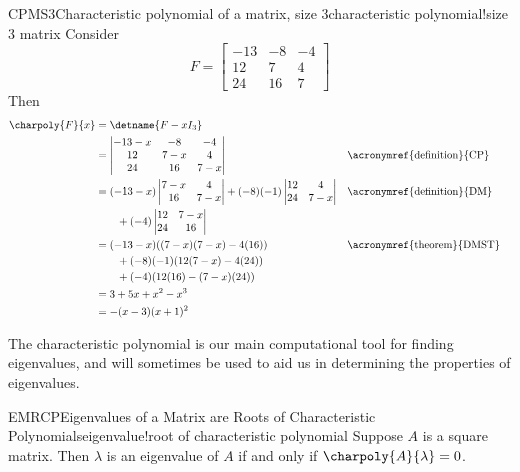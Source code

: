 %
%
\begin{example}{CPMS3}{Characteristic polynomial of a matrix, size 3}{characteristic polynomial!size 3 matrix}
Consider
%
\begin{equation*}
F=
\begin{bmatrix}
-13 & -8 & -4\\ 
12 & 7 & 4\\ 
24 & 16 & 7
\end{bmatrix}
\end{equation*}
%
Then
%
\begin{align*}
\charpoly{F}{x}&=\detname{F-xI_3}\\
&=
\begin{vmatrix}
-13-x & -8 & -4\\ 
12 & 7-x & 4\\ 
24 & 16 & 7-x
\end{vmatrix}&&\text{\acronymref{definition}{CP}}\\
%
&=
(-13-x)
\begin{vmatrix}
7-x & 4\\ 
16 & 7-x
\end{vmatrix}
+(-8)(-1)
\begin{vmatrix}
12  & 4\\ 
24  & 7-x
\end{vmatrix}&&\text{\acronymref{definition}{DM}}\\
&\quad\quad
+(-4)
\begin{vmatrix}
12 & 7-x\\ 
24 & 16
\end{vmatrix}\\
%
&=(-13-x)((7-x)(7-x)-4(16))&&\text{\acronymref{theorem}{DMST}}\\
&\quad\quad +(-8)(-1)(12(7-x)-4(24))\\
&\quad\quad +(-4)(12(16)-(7-x)(24))\\
%
&=3+5x+x^2-x^3\\
%
&=-(x-3)(x+1)^2
%
\end{align*}
%
\end{example}
%
The characteristic polynomial is our main computational tool for finding eigenvalues, and will sometimes be used to aid us in determining the properties of eigenvalues.
%
\begin{theorem}{EMRCP}{Eigenvalues of a Matrix are Roots of Characteristic Polynomials}{eigenvalue!root of characteristic polynomial}
Suppose $A$ is a square matrix.  
Then $\lambda$ is an eigenvalue of $A$ if and only if $\charpoly{A}{\lambda}=0$.
\end{theorem}
